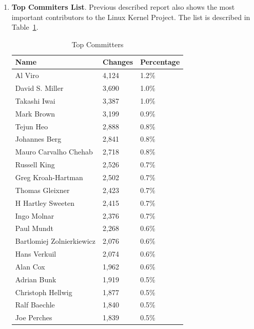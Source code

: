 \documentclass[11pt]{article}
\begin{document}
\begin{enumerate}
\item{\textbf{Top Commiters List}}. Previous described report also shows the most important contributors to the Linux Kernel Project. The list is described in Table~\ref{tab:topcommitters}.
\begin{table}[H]
  \begin{center}
    \begin{tabular}{ | l | l | l | }
    \hline
    Name & Changes & Percentage\\
    \hline
    Al Viro                    & 4,124 & 1.2\%\\
    David S. Miller            & 3,690 & 1.0\%\\
    Takashi Iwai               & 3,387 & 1.0\%\\
    Mark Brown                 & 3,199 & 0.9\%\\
    Tejun Heo                  & 2,888 & 0.8\%\\
    Johannes Berg              & 2,841 & 0.8\%\\
    Mauro Carvalho Chehab      & 2,718 & 0.8\%\\
    Russell King               & 2,526 & 0.7\%\\
    Greg Kroah-Hartman         & 2,502 & 0.7\%\\
    Thomas Gleixner            & 2,423 & 0.7\%\\
    H Hartley Sweeten          & 2,415 & 0.7\%\\
    Ingo Molnar                & 2,376 & 0.7\%\\
    Paul Mundt                 & 2,268 & 0.6\%\\
    Bartlomiej Zolnierkiewicz  & 2,076 & 0.6\%\\
    Hans Verkuil               & 2,074 & 0.6\%\\
    Alan Cox                   & 1,962 & 0.6\%\\
    Adrian Bunk                & 1,919 & 0.5\%\\
    Christoph Hellwig          & 1,877 & 0.5\%\\
    Ralf Baechle               & 1,840 & 0.5\%\\
    Joe Perches                & 1,839 & 0.5\%\\
    \hline
    \end{tabular}
    \caption{Top Committers}
    \label{tab:topcommitters}
  \end{center}
\end{table}


\end{enumerate}
\end{document}
